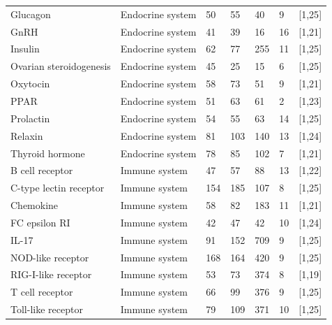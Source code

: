 \begin{table}[H]
\begin{adjustbox}{center}
\begin{tabular}{|l|l|l|l|l|l|l|}
Glucagon                & Endocrine system                & 50   & 55  & 40    & 9  & {[}1,25{]}  \\   
GnRH                    & Endocrine system                & 41   & 39  & 16    & 16 & {[}1,21{]}  \\  
Insulin                 & Endocrine system                & 62   & 77  & 255   & 11 & {[}1,25{]}  \\  
Ovarian steroidogenesis & Endocrine system                & 45   & 25  & 15    & 6  & {[}1,25{]}  \\   
Oxytocin                & Endocrine system                & 58   & 73  & 51    & 9  & {[}1,21{]}  \\    
PPAR                    & Endocrine system                & 51   & 63  & 61    & 2  & {[}1,23{]}  \\       
Prolactin               & Endocrine system                & 54   & 55  & 63    & 14 & {[}1,25{]}  \\   
Relaxin                 & Endocrine system                & 81   & 103 & 140   & 13 & {[}1,24{]}  \\   
Thyroid hormone         & Endocrine system                & 78   & 85  & 102   & 7  & {[}1,21{]}  \\\hline       
B cell receptor         & Immune system                   & 47   & 57  & 88    & 13 & {[}1,22{]}  \\ 
C-type lectin receptor  & Immune system                   & 154  & 185 & 107   & 8  & {[}1,25{]}  \\            
Chemokine               & Immune system                   & 58   & 82  & 183   & 11 & {[}1,21{]}  \\              
FC epsilon RI           & Immune system                   & 42   & 47  & 42    & 10 & {[}1,24{]}  \\    
IL-17                   & Immune system                   & 91   & 152 & 709   & 9  & {[}1,25{]}  \\  
NOD-like receptor       & Immune system                   & 168  & 164 & 420   & 9  & {[}1,25{]}  \\    
RIG-I-like receptor     & Immune system                   & 53   & 73  & 374   & 8  & {[}1,19{]}  \\    
T cell receptor         & Immune system                   & 66   & 99  & 376   & 9  & {[}1,25{]}  \\                   
Toll-like receptor      & Immune system                   & 79   & 109 & 371   & 10 & {[}1,25{]}  \\\hline  

\end{tabular}
\end{adjustbox}
\end{table}
